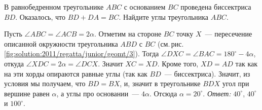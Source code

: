 \problem
В равнобедренном треугольнике $ABC$ с основанием $BC$ проведена биссектриса
$BD$.
Оказалось, что $BD + DA = BC$.
Найдите углы треугольника $ABC$.

%
\label{solution:2011/regatta/junior/geomt/3}%
Пусть $\angle ABC = \angle ACB = 2 \alpha$.
Отметим на стороне $BC$ точку $X$~--- пересечение описанной окружности
треугольника $ABD$ с $BC$
(см.\,рис.\,\ref{fig:solution:2011/regatta/junior/geomt/3}).
Тогда
$\angle DXC = \angle BAC = 180^\circ - 4 \alpha$,
откуда $\angle XDC = 2 \alpha = \angle DCX$.
Значит $XC = XD$.
Кроме того, $XD = AD$ так как на эти хорды опираются равные углы
(так как $BD$~--- биссектриса).
Значит, из условия мы получаем, что $BD = BX$, и, значит в треугольнике $BDX$
угол при вершине равен $\alpha$, а углы про основании~--- $4 \alpha$.
Отсюда $\alpha = 20^\circ$.
\emph{Ответ:}
$40^\circ$, $40^\circ$ и $100^\circ$.

\endproblem
